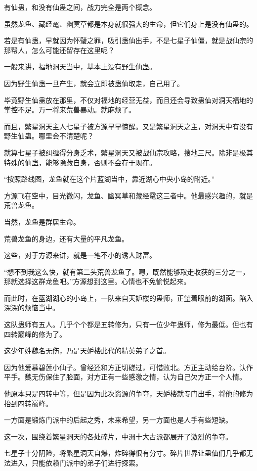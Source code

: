 \begin{this_body}
有仙蛊，和没有仙蛊之间，战力完全是两个概念。

虽然龙鱼、藏经鼋、幽冥草都是本身就很强大的生命，但它们身上是没有仙蛊的。

若是有仙蛊，早就因为怀璧之罪，吸引蛊仙出手，不是七星子仙僵，就是战仙宗的那帮人，怎么可能还留存在这里呢？

一般来讲，福地洞天当中，基本上没有野生仙蛊。

因为野生仙蛊一旦产生，就会立即被蛊仙取走，自己用了。

毕竟野生仙蛊放在那里，不仅对福地的经营无益，而且还会导致蛊仙对洞天福地的掌控不足。万一将来荒兽暴动。就麻烦了。

而且，繁星洞天主人七星子被方源早早惊醒。又是繁星洞天之主，对洞天中有没有野生仙蛊。哪里会不清楚呢？

就算七星子被纠缠得分身乏术，繁星洞天又被战仙宗攻略，搜地三尺。除非是极其特殊的仙蛊，能够隐藏自身，否则不会存于现在。

“按照路线图，龙鱼就在这个片蓝湖当中，靠近湖心中央小岛的附近。”

方源飞在空中，目光微闪，龙鱼、幽冥草和藏经鼋这三者中。他最感兴趣的，就是荒兽龙鱼。

当然，龙鱼是群居生命。

荒兽龙鱼的身边，还有大量的平凡龙鱼。

这些，对于方源来讲，就是一笔不小的诱人财富。

“想不到我这么快，就有第二头荒兽龙鱼了。嗯，既然能够取走收获的三分之一，那就选择这群龙鱼吧。”方源想到这里。心情也不免愉悦起来。

而此时，在蓝湖湖心的小岛上，一队来自天妒楼的蛊师，正望着眼前的湖面。陷入深深的烦恼当中。

这队蛊师有五人。几乎个个都是五转修为，只有一位少年蛊师，修为最低。但也有四转巅峰的修为了。

这少年姓魏名无伤，乃是天妒楼此代的精英弟子之首。

因为他爱慕碧莲小仙子。曾经还和方正切磋过，可惜败北。方正主动给台阶。认作平手。魏无伤保住了脸面，对方正有一些感激之情，认为自己欠方正一个人情。

他原本只是四转中等，但是因为此次资源的争夺，天妒楼就专门出手，将他的修为抬到四转巅峰。

一方面是锻炼门派中的后起之秀，未来希望，另一方面也是人手有些短缺。

这一次，围绕着繁星洞天的各处碎片，中洲十大古派都展开了激烈的争夺。

七星子十分阴险，将繁星洞天自爆，炸碎得很有分寸。碎片世界让蛊仙们几乎都无法进入，只能依赖门派中的弟子们进行探索。


\end{this_body}
